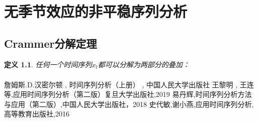 \documentclass[12pt, a4paper, oneside]{ctexbook}
\newtheorem{definition}[theorem]{定义}
\begin{document}
\chapter{无季节效应的非平稳序列分析}
\section{Crammer分解定理}
\begin{definition}
    任何一个时间序列${x_t}$都可以分解为两部分的叠加：
    \begin{equation}
        \begin{aligned}
            
        \end{aligned}
    \end{equation}
\end{definition}







\begin{thebibliography}{4}
    詹姆斯.D.汉密尔顿 {,} 时间序列分析（上册） {,} 中国人民大学出版社
    王黎明 {,} 王连等{,}应用时间序列分析（第二版）复旦大学出版社{,}2019
    易丹辉{,}时间序列分析方法与应用（第二版）{,}中国人民大学出版社，2018
    史代敏{,}谢小燕{,}应用时间序列分析{,}高等教育出版社{,}2016
\end{thebibliography}

\appendix
\end{document}
